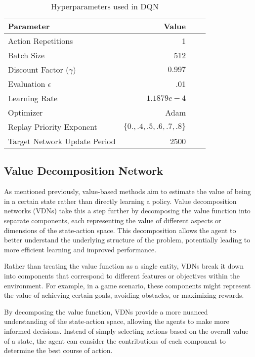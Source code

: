 \documentclass[11pt]{article}
\begin{document}
\begin{table*} [h!]
\caption{Hyperparameters used in DQN}
\begin{center}
\begin{tabular}{lrrr}
\toprule
\textbf{Parameter} & \textbf{Value} \\ \midrule
Action Repetitions & 1\\
Batch Size & 512 \\
Discount Factor ($\gamma$) & $0.997$\\
Evaluation $\epsilon$ & .01 \\
Learning Rate & $1.1879e-4$ \\
Optimizer & Adam\\
Replay Priority Exponent & $\{0., .4, .5, .6, .7, .8\}$  \\
Target Network Update Period & 2500 \\
\bottomrule
\end{tabular}
\label{tab:dqn_hparams_values}
\end{center}
\end{table*}

\subsection{Value Decomposition Network}
As mentioned previously, value-based methods aim to estimate the value of being in a certain state rather than directly learning a policy. Value decomposition networks (VDNs) take this a step further by decomposing the value function into separate components, each representing the value of different aspects or dimensions of the state-action space. This decomposition allows the agent to better understand the underlying structure of the problem, potentially leading to more efficient learning and improved performance.

Rather than treating the value function as a single entity, VDNs break it down into components that correspond to different features or objectives within the environment. For example, in a game scenario, these components might represent the value of achieving certain goals, avoiding obstacles, or maximizing rewards.

By decomposing the value function, VDNs provide a more nuanced understanding of the state-action space, allowing the agents to make more informed decisions. Instead of simply selecting actions based on the overall value of a state, the agent can consider the contributions of each component to determine the best course of action.
\end{document}
